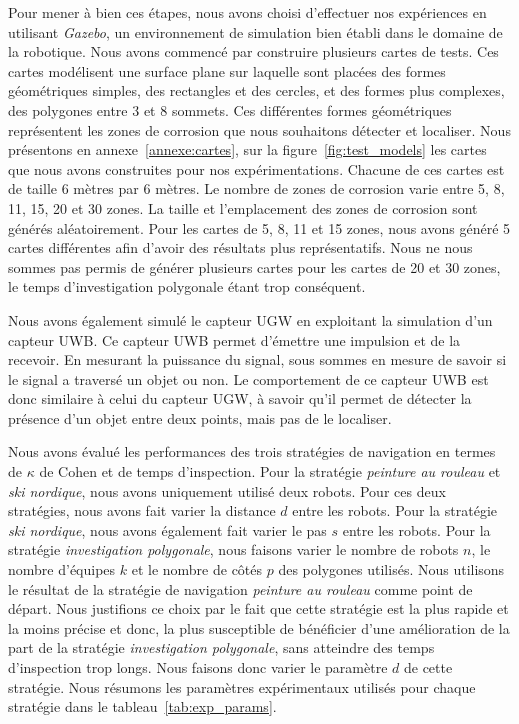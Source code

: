 \documentclass[english,RandD]{rapportPFE}  %
\begin{document}
		Pour mener à bien ces étapes, nous avons choisi d'effectuer nos expériences en utilisant \textit{Gazebo}, un environnement de simulation bien établi dans le domaine de la robotique.
		Nous avons commencé par construire plusieurs cartes de tests.
		Ces cartes modélisent une surface plane sur laquelle sont placées des formes géométriques simples, des rectangles et des cercles, et des formes plus complexes, des polygones entre 3 et 8 sommets.
		Ces différentes formes géométriques représentent les zones de corrosion que nous souhaitons détecter et localiser.
		Nous présentons en annexe~\ref{annexe:cartes}, sur la figure~\ref{fig:test_models} les cartes que nous avons construites pour nos expérimentations.
		Chacune de ces cartes est de taille 6 mètres par 6 mètres.
		Le nombre de zones de corrosion varie entre 5, 8, 11, 15, 20 et 30 zones.
		La taille et l'emplacement des zones de corrosion sont générés aléatoirement.
		Pour les cartes de 5, 8, 11 et 15 zones, nous avons généré 5 cartes différentes afin d'avoir des résultats plus représentatifs.
		Nous ne nous sommes pas permis de générer plusieurs cartes pour les cartes de 20 et 30 zones, le temps d'investigation polygonale étant trop conséquent.

		Nous avons également simulé le capteur UGW en exploitant la simulation d'un capteur UWB.
		Ce capteur UWB permet d'émettre une impulsion et de la recevoir.
		En mesurant la puissance du signal, sous sommes en mesure de savoir si le signal a traversé un objet ou non.
		Le comportement de ce capteur UWB est donc similaire à celui du capteur UGW, à savoir qu'il permet de détecter la présence d'un objet entre deux points, mais pas de le localiser.

		Nous avons évalué les performances des trois stratégies de navigation en termes de $\kappa$ de Cohen et de temps d'inspection.
		Pour la stratégie \textit{peinture au rouleau} et \textit{ski nordique}, nous avons uniquement utilisé deux robots.
		Pour ces deux stratégies, nous avons fait varier la distance $d$ entre les robots.
		Pour la stratégie \textit{ski nordique}, nous avons également fait varier le pas $s$ entre les robots.
		Pour la stratégie \textit{investigation polygonale}, nous faisons varier le nombre de robots $n$, le nombre d'équipes $k$ et le nombre de côtés $p$ des polygones utilisés.
		Nous utilisons le résultat de la stratégie de navigation \textit{peinture au rouleau} comme point de départ.
		Nous justifions ce choix par le fait que cette stratégie est la plus rapide et la moins précise et donc, la plus susceptible de bénéficier d'une amélioration de la part de la stratégie \textit{investigation polygonale}, sans atteindre des temps d'inspection trop longs.
		Nous faisons donc varier le paramètre $d$ de cette stratégie.
		Nous résumons les paramètres expérimentaux utilisés pour chaque stratégie dans le tableau~\ref{tab:exp_params}.
\end{document}
